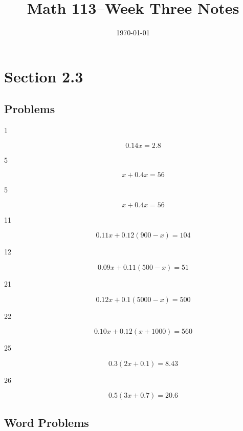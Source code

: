 \documentclass[letterpaper, landscape]{exam}
\title{Math 113--Week Three Notes}
\author{}
\date{\today}
\begin{document}
  \maketitle

  \section{Section 2.3} %

  \subsection{Problems} %
  
  \begin{description}

    \item[1] 
      \[
        0.14x = 2.8
      \]

    \item[5] 
      \[
        x + 0.4x = 56
      \]

    \item[5] 
      \[
        x + 0.4x = 56
      \]

    \item[11] 
      \[
        0.11x + 0.12(900 - x) = 104
      \]

    \item[12] 
      \[
        0.09x + 0.11 (500 - x) = 51
      \]

    \item[21] 
      \[
        0.12x + 0.1(5000 - x) = 500 
      \]

    \item[22] 
      \[
        0.10x + 0.12 (x + 1000) = 560
      \]

    \item[25] 
      \[
        0.3(2x + 0.1) = 8.43
      \]

    \item[26] 
      \[
        0.5(3x + 0.7) = 20.6
      \]

  \end{description}
  
  \subsection{Word Problems} %
\end{document}
